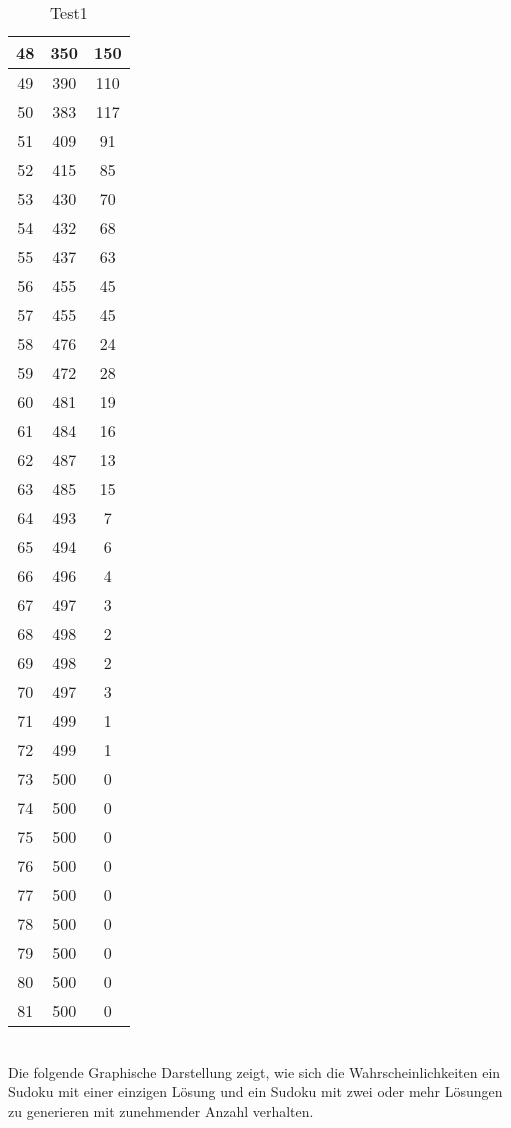 \documentclass[11pt,a4paper]{article}
\begin{document}
\begin{table}[htbp!]
\begin{center}
\begin{tabular}[htbp!]{|*{3}{c|}}
 48 & 350 & 150 \\ \hline 
 49 & 390 & 110 \\ \hline 
 50 & 383 & 117 \\ \hline 
 51 & 409 & 91 \\ \hline 
 52 & 415 & 85 \\ \hline 
 53 & 430 & 70 \\ \hline 
 54 & 432 & 68 \\ \hline 
 55 & 437 & 63 \\ \hline 
 56 & 455 & 45 \\ \hline 
 57 & 455 & 45 \\ \hline 
 58 & 476 & 24 \\ \hline 
 59 & 472 & 28 \\ \hline 
 60 & 481 & 19 \\ \hline 
 61 & 484 & 16 \\ \hline 
 62 & 487 & 13 \\ \hline 
 63 & 485 & 15 \\ \hline 
 64 & 493 & 7 \\ \hline 
 65 & 494 & 6 \\ \hline 
 66 & 496 & 4 \\ \hline 
 67 & 497 & 3 \\ \hline 
 68 & 498 & 2 \\ \hline 
 69 & 498 & 2 \\ \hline 
 70 & 497 & 3 \\ \hline 
 71 & 499 & 1 \\ \hline 
 72 & 499 & 1 \\ \hline 
 73 & 500 & 0 \\ \hline 
 74 & 500 & 0 \\ \hline 
 75 & 500 & 0 \\ \hline 
 76 & 500 & 0 \\ \hline 
 77 & 500 & 0 \\ \hline 
 78 & 500 & 0 \\ \hline 
 79 & 500 & 0 \\ \hline 
 80 & 500 & 0 \\ \hline 
 81 & 500 & 0 \\ \hline 
 \end{tabular}
 \end{center}
 \caption{Test1} 
\end{table} 
\ \\
Die folgende Graphische Darstellung zeigt, wie sich die Wahrscheinlichkeiten ein Sudoku mit einer einzigen Lösung und ein Sudoku mit zwei oder mehr Lösungen zu generieren mit zunehmender Anzahl verhalten.
\end{document}
